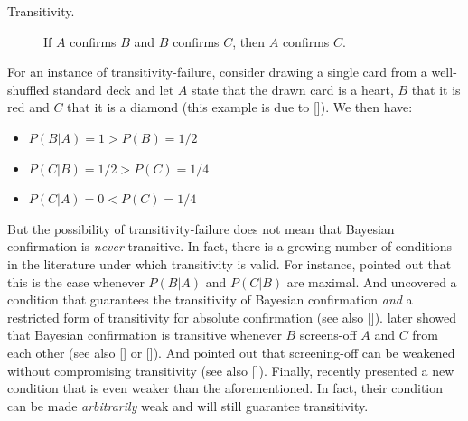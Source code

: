 \documentclass[a4paper,11pt]{article}
\begin{document}
\begin{description}
\item[Transitivity.] If $A$ confirms $B$ and $B$ confirms $C$, then $A$ confirms $C$.
\end{description}

\noindent For an instance of transitivity-failure, consider drawing a single card from a well-shuffled standard deck and let $A$ state that the drawn card is a heart, $B$ that it is red and $C$ that it is a diamond (this example is due to \citeauthor{Roche2012b} [\citeyear{Roche2012b}]). We then have: 

\begin{itemize}
\item $P(B|A)=1>P(B)=1/2$
\item $P(C|B)=1/2>P(C)=1/4$
\item $P(C|A)=0<P(C)=1/4$
\end{itemize}

\noindent But the possibility of transitivity-failure does not mean that Bayesian confirmation is \emph{never} transitive. In fact, there is a growing number of conditions in the literature under which transitivity is valid. For instance, \cite{Suppes1970} pointed out that this is the case whenever $P(B|A)$ and $P(C|B)$ are maximal. And \cite{Hesse1970} uncovered a condition that guarantees the transitivity of Bayesian confirmation \emph{and} a restricted form of transitivity for absolute confirmation (see also \citeauthor{Koscholke2023} [\citeyear{Koscholke2023}]). \cite{Shogenji2003} later showed that Bayesian confirmation is transitive whenever $B$ screens-off $A$ and $C$ from each other (see also \citeauthor{Reichenbach1956} [\citeyear{Reichenbach1956}] or \citeauthor{Eellssober1983} [\citeyear{Eellssober1983}]). And \cite{Roche2012a} pointed out that screening-off can be weakened without compromising transitivity (see also \citeauthor{Suppes1986} [\citeyear{Suppes1986}]). Finally, \cite{Atkinson2021,Atkinson2021b} recently presented a new condition that is even weaker than the aforementioned. In fact, their condition can be made \emph{arbitrarily} weak and will still guarantee transitivity.
\end{document}
